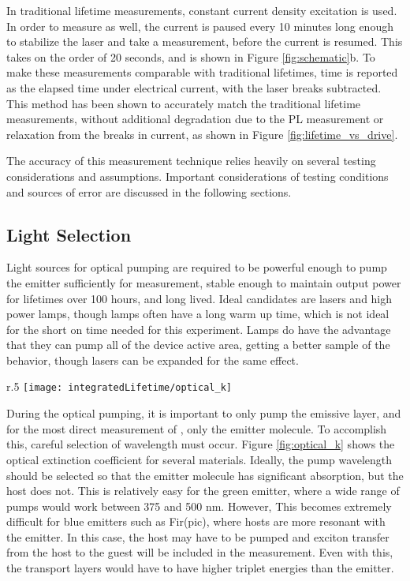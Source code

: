 \documentclass[../thesis.tex]{subfiles}
\begin{document}
In traditional lifetime measurements, constant current density excitation is used.  
In order to measure \pl as well, the current is paused every 10 minutes long enough to stabilize the laser and take a measurement, before the current is resumed.
This takes on the order of 20 seconds, and is shown in Figure \ref{fig:schematic}b.
To make these measurements comparable with traditional lifetimes, time is reported as the elapsed time under electrical current, with the laser breaks subtracted.
This method has been shown to accurately match the traditional lifetime measurements, without additional degradation due to the PL measurement or relaxation from the breaks in current, as shown in Figure \ref{fig:lifetime_vs_drive}.

The accuracy of this measurement technique relies heavily on several testing considerations and assumptions.
Important considerations of testing conditions and sources of error are discussed in the following sections.

\subsection{Light Selection}

Light sources for optical pumping are required to be powerful enough to pump the emitter sufficiently for measurement, stable enough to maintain output power for lifetimes over 100 hours, and long lived.
Ideal candidates are lasers and high power lamps, though lamps often have a long warm up time, which is not ideal for the short on time needed for this experiment.
Lamps do have the advantage that they can pump all of the device active area, getting a better sample of the behavior, though lasers can be expanded for the same effect.

\begin{wrapfigure}{r}{.5\textwidth}
\centering
\texttt{[image: integratedLifetime/optical\_k]}
\caption{Extinction coefficients shown for the green emitter \irppy and blue emitter Fir(pic) as well as a few host materials.}
\label{fig:optical_k}
\end{wrapfigure}

During the optical pumping, it is important to only pump the emissive layer, and for the most direct measurement of \pl, only the emitter molecule.
To accomplish this, careful selection of wavelength must occur.  
Figure \ref{fig:optical_k} shows the optical extinction coefficient for several materials.  
Ideally, the pump wavelength should be selected so that the emitter molecule has significant absorption, but the host does not.  
This is relatively easy for the green emitter, \irppy where a wide range of pumps would work between 375 and 500 nm.
However, This becomes extremely difficult for blue emitters such as Fir(pic), where hosts are more resonant with the emitter.  
In this case, the host may have to be pumped and exciton transfer from the host to the guest will be included in the measurement.
Even with this, the transport layers would have to have higher triplet energies than the emitter.
\end{document}

